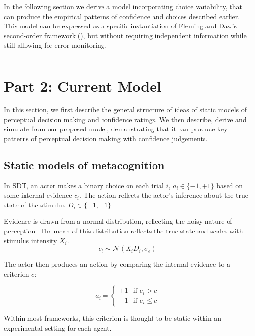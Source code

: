 \documentclass[
]{article}
\begin{document}
In the following section we derive a model incorporating choice
variability, that can produce the empirical patterns of confidence and
choices described earlier. This model can be expressed as a specific
instantiation of Fleming and Daw's second-order framework
(), but without requiring independent information
while still allowing for error-monitoring.

\begin{center}\rule{0.5\linewidth}{0.5pt}\end{center}

\section{Part 2: Current Model}\label{part-2-current-model}

In this section, we first describe the general structure of ideas of
static models of perceptual decision making and confidence ratings. We
then describe, derive and simulate from our proposed model,
demonstrating that it can produce key patterns of perceptual decision
making with confidence judgements.

\subsection{Static models of
metacognition}\label{static-models-of-metacognition}

In SDT, an actor makes a binary choice on each trial \(i\),
\(a_i \in \{-1,+1\}\) based on some internal evidence \(e_i\). The
action reflects the actor's inference about the true state of the
stimulus \(D_i \in \{-1,+1\}\).

Evidence is drawn from a normal distribution, reflecting the noisy
nature of perception. The mean of this distribution reflects the true
state and scales with stimulus intensity \(X_i\). \[
e_i \sim \mathcal{N}(X_iD_i,\sigma_e)
\]

The actor then produces an action by comparing the internal evidence to
a criterion \(c\):

\[
a_i = \begin{cases}+1 & \text{if } e_i > c \\ -1 & \text{if } e_i \le c\end{cases}
\]

Within most frameworks, this criterion is thought to be static within an
experimental setting for each agent.
\end{document}
